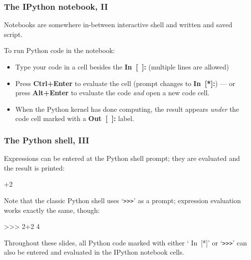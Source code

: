 \documentclass[english,serif,mathserif,xcolor=pdftex,dvipsnames,table]{beamer}
\begin{document}
\begin{frame}
  \frametitle{The IPython notebook, II}

  Notebooks are somewhere in-between interactive shell and written and saved script.

  \+
  To run Python code in the notebook:
  \begin{itemize}
  \item Type your code in a cell besides the {\ttfamily\bfseries\color{blue}
      In~[~]:} (multiple lines are allowed)
  \item Press \textbf{Ctrl+Enter} to evaluate the cell (prompt changes to
    {\ttfamily\bfseries\color{blue} In~[*]:}) --- or press \textbf{Alt+Enter} to
    evaluate the code \emph{and} open a new code cell.
  \item When the Python kernel has done computing, the result appears \emph{under} the
    code cell marked with a {\ttfamily\bfseries\color{red} Out~[~]:} label.
  \end{itemize}

\end{frame}


\begin{frame}
  \frametitle{The Python shell, III}
  \smaller

  Expressions can be entered at the Python shell prompt; they are evaluated and the
  result is printed:
\begin{semiverbatim}
+2
\end{semiverbatim}

  \+ Note that the classic Python shell uses `\texttt{>{}>{}>}' as a prompt;
  expression evaluation works exactly the same, though:
\begin{semiverbatim}
>{}>{}> 2+2
4
\end{semiverbatim}

  \+ Throughout these slides, all Python code marked with either `{\color{blue}
    In~[*]}' or `\texttt{>{}>{}>}' can also be entered and evaluated in the IPython
  notebook cells.
\end{frame}
\end{document}
